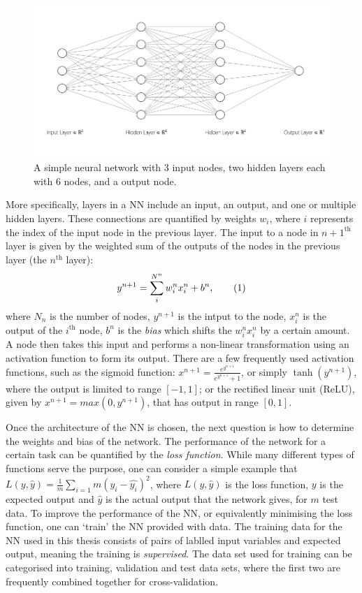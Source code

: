 \begin{figure}[htbp]
   \centering
\includegraphics[width=.78\textwidth]{Theory/plots/NN.png}

\caption{A simple neural network with 3 input nodes, two hidden layers each with 6 nodes, and a output node.}
\label{fig:ML:NN}
\end{figure}

More specifically, layers in a NN include an input, an output, 
and one or multiple hidden layers.
These connections are quantified by weights $w_i$, 
where $i$ represents the index of the input node in the previous
layer. The input to a node in $n+1^{\text{th}}$ layer is given by the weighted sum of the outputs of the
nodes in the previous layer (the $n^{\text{th}}$ layer):
\[
   y^{n+1} = \sum_i^{N^n} w_i^n x_i^n + b^n,   
\addtag \]
where $N_n$ is the number of nodes,
$y^{n+1}$ is the intput to the node, $x_i^n$ is the output of the $i^{\text{th}}$ node,  
$b^n$ is the \textit{bias} which shifts the $w_i^n x_i^n$ by a certain amount.
A node then takes this input and performs a non-linear transformation using an activation function
to form its output.
There are a few frequently used activation functions, such as the sigmoid function: 
$x^{n+1} = \frac{e^{y^{n+1}}}{e^{y^{n+1}} + 1}$, or simply $\tanh(y^{n+1})$,
where the output is limited to range $[-1, 1]$;
or the rectified linear unit (ReLU), given by $x^{n+1} = max(0, y^{n+1})$, that 
has output in range $[0, 1]$.

Once the architecture of the NN is chosen, the next question is how to determine the 
weights and bias of the network.
The performance of the network for a certain task can be quantified by the \textit{loss function}.
While many different types of functions serve the purpose, one can consider a simple example that
$L(y, \hat{y}) = \frac{1}{m} \sum_{i=1}m (y_i - \hat{y_i})^2$,
where $L(y, \hat{y})$ is the loss function, $y$ is the expected output and $\hat{y}$ is
the actual output that the network gives, for $m$ test data.
To improve the performance of the NN, or equivalently minimising the loss function, 
one can `train' the NN provided with data.
The training data for the NN used in this thesis consists of pairs 
of lablled input variables and expected output, meaning the training is \textit{supervised}.
The data set used for training can be categorised into training, validation and test data sets, 
where the first two are frequently combined together for cross-validation. 

